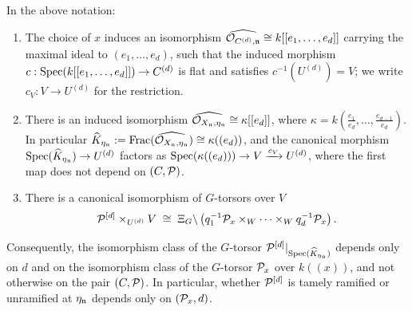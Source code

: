 \begin{lemma}\label{lemma:formal_local_invariance}
    In the above notation:
    \begin{enumerate}
        \item The choice of $x$ induces an isomorphism $\widehat{\mathcal{O}_{C^{(d)}, \mathfrak{n}}} \cong k[[e_1, \dots, e_d]]$ carrying
        the maximal ideal to $(e_1, \dots, e_d)$, such that the induced morphism $c: \operatorname{Spec}(k[[e_1, \dots, e_d]]) \to C^{(d)}$
        is flat and satisfies $c^{-1}(U^{(d)}) = V$; we write $c_V : V \to U^{(d)}$ for the restriction.
        \item There is an induced isomorphism $\widehat{\mathcal{O}_{X_{\mathfrak{n}}, \eta_{\mathfrak{n}}}} \cong \kappa[[e_d]]$, where
        $\kappa = k(\frac{e_1}{e_d}, \dots, \frac{e_{d-1}}{e_d})$. In particular
        $\widehat{K}_{\eta_{\mathfrak{n}}} := \operatorname{Frac}(\widehat{\mathcal{O}_{X_{\mathfrak{n}}, \eta_{\mathfrak{n}}}}) \cong \kappa((e_d))$, and the canonical
        morphism $\operatorname{Spec}(\widehat{K}_{\eta_{\mathfrak{n}}}) \to U^{(d)}$ factors as
        $\operatorname{Spec}(\kappa((e_d))) \to V \xrightarrow{c_V} U^{(d)}$, where the first map does not depend on $(C, \mathcal{P})$.
        \item There is a canonical isomorphism of $G$-torsors over $V$
        $$ \mathcal{P}^{[d]} \times_{U^{(d)}} V \;\cong\; \Xi_G \backslash \left( q_1^{-1}\mathcal{P}_x \times_W \cdots \times_W q_d^{-1}\mathcal{P}_x \right).$$
    \end{enumerate}
    Consequently, the isomorphism class of the $G$-torsor
    $\mathcal{P}^{[d]}|_{\operatorname{Spec}(\widehat{K}_{\eta_{\mathfrak{n}}})}$ depends only on $d$ and on
    the isomorphism class of the $G$-torsor $\mathcal{P}_x$ over $k((x))$, and not
    otherwise on the pair $(C,\mathcal{P})$. In particular, whether $\mathcal{P}^{[d]}$ is
    tamely ramified or unramified at $\eta_{\mathfrak{n}}$ depends only on
    $(\mathcal{P}_x,d)$.
\end{lemma}

